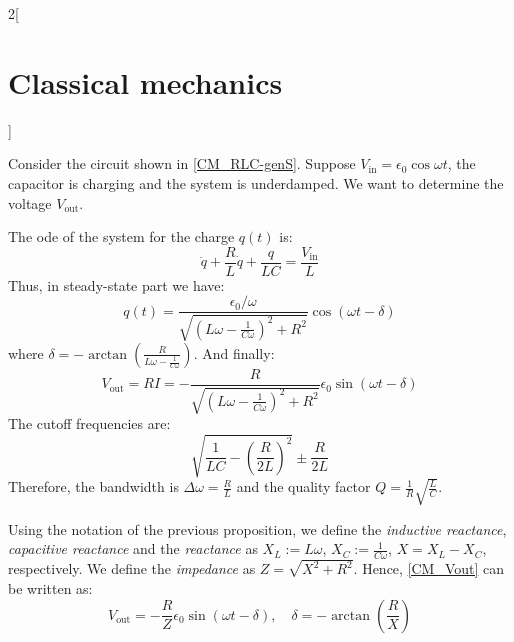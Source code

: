 \documentclass[../../../main_physics.tex]{subfiles}
\begin{document}
\begin{multicols}{2}[\section{Classical mechanics}]
\begin{proposition}
    Consider the circuit shown in \cref{CM_RLC-genS}. Suppose $V_\text{in}=\epsilon_0\cos\omega t$, the capacitor is charging and the system is underdamped. We want to determine the voltage $V_\text{out}$.
    \begin{center}
      \begin{minipage}{\linewidth}
        \centering
        
        \label{CM_RLC-genS}
      \end{minipage}
    \end{center}
    The ode of the system for the charge $q(t)$ is: $$\ddot{q}+\frac{R}{L}\dot{q}+\frac{q}{LC}=\frac{V_\text{in}}{L}$$ Thus, in steady-state part we have: $$q(t)=\frac{\epsilon_0/\omega}{\sqrt{{\left(L\omega-\frac{1}{C\omega}\right)}^2+R^2}}\cos(\omega t-\delta)$$ where $\delta=-\arctan\left(\frac{R}{L\omega-\frac{1}{C\omega}}\right)$.
    And finally:
    \begin{equation}\label{CM_Vout}
      V_\text{out}=RI=-\frac{R}{\sqrt{{\left(L\omega-\frac{1}{C\omega}\right)}^2+R^2}}\epsilon_0\sin(\omega t-\delta)
    \end{equation}
    The cutoff frequencies are: $$\sqrt{\frac{1}{LC}-{\left(\frac{R}{2L}\right)}^2}\pm\frac{R}{2L}$$
    Therefore, the bandwidth is $\Delta\omega=\frac{R}{L}$ and the quality factor $Q=\frac{1}{R}\sqrt{\frac{L}{C}}$.
  \end{proposition}
  \begin{definition}
    Using the notation of the previous proposition, we define the \emph{inductive reactance}, \emph{capacitive reactance} and the \emph{reactance} as $X_L:=L\omega$, $X_C:=\frac{1}{C\omega}$, $X=X_L-X_C$, respectively. We define the \emph{impedance} as $Z=\sqrt{X^2+R^2}$. Hence, \cref{CM_Vout} can be written as: $$V_\text{out}=-\frac{R}{Z}\epsilon_0\sin(\omega t-\delta),\quad\delta=-\arctan\left(\frac{R}{X}\right)$$
  \end{definition}

\end{multicols}
\end{document}
